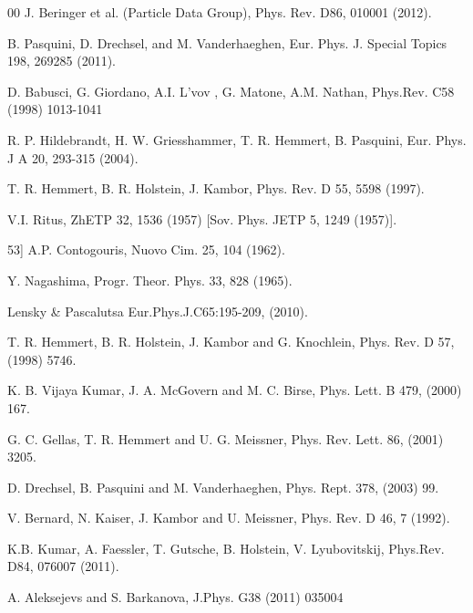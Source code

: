 \documentclass[3p,times,twocolumn]{revtex4}
\begin{document}
\begin{thebibliography}{00}
J. Beringer et al. (Particle Data Group), Phys. Rev.
D86, 010001 (2012).

B. Pasquini, D. Drechsel, and M. Vanderhaeghen,
Eur. Phys. J. Special Topics 198, 269\textendash{}285 (2011).

D. Babusci, G. Giordano, A.I. L'vov , G. Matone,
A.M. Nathan, Phys.Rev. C58 (1998) 1013-1041

R. P. Hildebrandt, H. W. Griesshammer, T. R.
Hemmert, B. Pasquini, Eur. Phys. J A 20, 293-315 (2004).

T. R. Hemmert, B. R. Holstein, J. Kambor, Phys. Rev.
D 55, 5598 (1997).

V.I. Ritus, ZhETP 32, 1536 (1957) {[}Sov. Phys.
JETP 5, 1249 (1957){]}. 

\bibitem{multi-2}{[}53{]} A.P. Contogouris, Nuovo Cim. 25, 104 (1962). 

Y. Nagashima, Progr. Theor. Phys. 33, 828 (1965). 

Lensky \& Pascalutsa Eur.Phys.J.C65:195-209, (2010).

T. R. Hemmert, B. R. Holstein, J. Kambor and G. Knochlein,
Phys. Rev. D 57, (1998) 5746. 

K. B. Vijaya Kumar, J. A. McGovern and M. C. Birse,
Phys. Lett. B 479, (2000) 167. 

G. C. Gellas, T. R. Hemmert and U. G. Meissner, Phys.
Rev. Lett. 86, (2001) 3205. 

D. Drechsel, B. Pasquini and M. Vanderhaeghen, Phys.
Rept. 378, (2003) 99. 

V. Bernard, N. Kaiser, J. Kambor and U. Meissner,
Phys. Rev. D 46, 7 (1992).

K.B. Kumar, A. Faessler, T. Gutsche, B. Holstein,
V. Lyubovitskij, Phys.Rev. D84, 076007 (2011). 

A. Aleksejevs and S. Barkanova, J.Phys. G38 (2011) 035004
\end{thebibliography}
\end{document}
